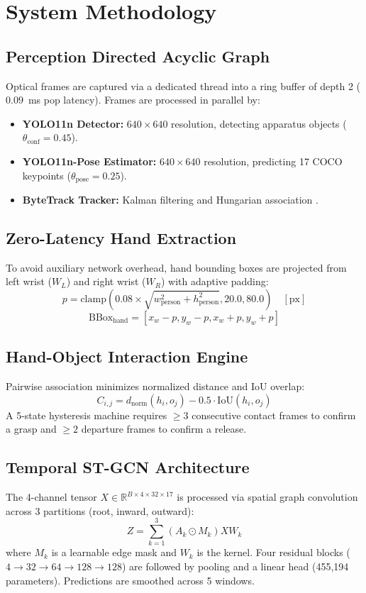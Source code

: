 \documentclass[journal,twocolumn]{IEEEtran}
\begin{document}
\section{System Methodology}

\subsection{Perception Directed Acyclic Graph}
Optical frames are captured via a dedicated thread into a ring buffer of depth 2 ($0.09$~ms pop latency). Frames are processed in parallel by:
\begin{itemize}
    \item \textbf{YOLO11n Detector:} $640 \times 640$ resolution, detecting apparatus objects ($\theta_{\text{conf}} = 0.45$).
    \item \textbf{YOLO11n-Pose Estimator:} $640 \times 640$ resolution, predicting 17 COCO keypoints ($\theta_{\text{pose}} = 0.25$).
    \item \textbf{ByteTrack Tracker:} Kalman filtering and Hungarian association \cite{kuhn1955hungarian, zhang2022bytetrack}.
\end{itemize}

\subsection{Zero-Latency Hand Extraction}
To avoid auxiliary network overhead, hand bounding boxes are projected from left wrist ($W_L$) and right wrist ($W_R$) with adaptive padding:
\begin{equation}
p = \text{clamp}\left(0.08 \times \sqrt{w_{\text{person}}^2 + h_{\text{person}}^2}, 20.0, 80.0\right) \quad [\text{px}]
\end{equation}
$$\text{BBox}_{\text{hand}} = [x_w - p, y_w - p, x_w + p, y_w + p]$$

\subsection{Hand-Object Interaction Engine}
Pairwise association minimizes normalized distance and IoU overlap:
\begin{equation}
C_{i,j} = d_{\text{norm}}(h_i, o_j) - 0.5 \cdot \text{IoU}(h_i, o_j)
\end{equation}
A 5-state hysteresis machine requires $\ge 3$ consecutive contact frames to confirm a grasp and $\ge 2$ departure frames to confirm a release.

\subsection{Temporal ST-GCN Architecture}
The 4-channel tensor $X \in \mathbb{R}^{B \times 4 \times 32 \times 17}$ is processed via spatial graph convolution across 3 partitions (root, inward, outward):
\begin{equation}
Z = \sum_{k=1}^3 (A_k \odot M_k) X W_k
\end{equation}
where $M_k$ is a learnable edge mask and $W_k$ is the kernel. Four residual blocks ($4 \to 32 \to 64 \to 128 \to 128$) are followed by pooling and a linear head (455,194 parameters). Predictions are smoothed across 5 windows.
\end{document}
